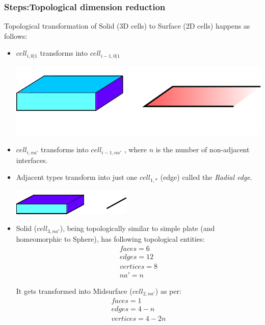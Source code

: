 \subsubsection{Steps:Topological dimension reduction}
Topological transformation of Solid (3D cells) to Surface (2D cells) happens as follows:
\begin{itemize}
[noitemsep,topsep=2pt,parsep=2pt,partopsep=2pt,leftmargin=*]
\item $cell_{i,0|1}$ transforms into $cell_{i-1,0|1}$ \label{rule_c32}
	\begin{center}
	\includegraphics[width=0.6\linewidth]{../Common/images/Cell3201.pdf} 
	\end{center}
\item $cell_{i,na'}$ transforms into $cell_{i-1,na'}$ , where $n$ is the number of non-adjacent interfaces.

\item  Adjacent types transform into just one $cell_{1,*}$ (edge) called the {\em Radial edge}.
	\begin{center}
	\includegraphics[width=0.45\linewidth]{../Common/images/Cell31a.pdf} 
	\end{center}
	
\item  Solid ($cell_{3,na'}$), being topologically similar to simple plate (and homeomorphic to Sphere), has following topological entities: 
\begin{align*}
faces=6\\edges=12\\vertices=8\\na' = n
\end{align*}
 
It gets transformed into Midsurface ($cell_{2,na'}$) as per:
\begin{equation}
\begin{aligned}
faces=1\\
edges=4-n\\
vertices=4-2n
\end{aligned}
\label{eqn_cellularna}
\end{equation}


\end{itemize}
